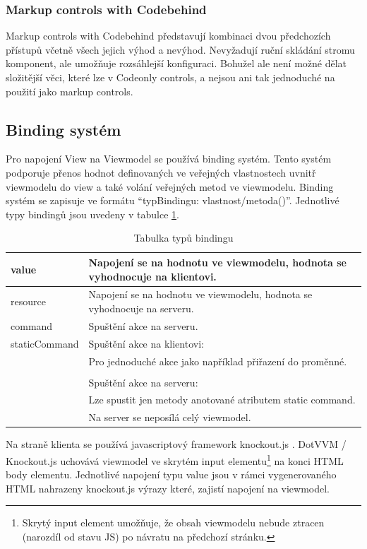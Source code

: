  \subsubsection{Markup controls with Codebehind}
 Markup controls with Codebehind představují kombinaci dvou předchozích přístupů včetně všech jejich výhod a nevýhod. Nevyžadují ruční skládání stromu komponent, ale umožňuje rozsáhlejší konfiguraci. Bohužel ale není možné dělat složitější věci, které lze v Codeonly controls, a nejsou ani tak jednoduché na použití jako markup controls.
 
\subsection*{Binding systém}
\label{DotVVMBinding}
Pro napojení View na Viewmodel se používá binding systém. Tento systém podporuje přenos hodnot definovaných ve veřejných vlastnostech uvnitř viewmodelu do view a také volání veřejných metod ve viewmodelu.
Binding systém se zapisuje ve formátu “{typBindingu: vlastnost/metoda()}”\cite{DotVVM-Binding}. Jednotlivé typy bindingů jsou uvedeny v tabulce \ref{tab: Tabulka typů bindingu}.

\begin{table}[H]
	\caption{Tabulka typů bindingu} 
	\centering
	\begin{tabular}{m{8em}|m{30em}}
		\toprule
		value & Napojení se na hodnotu ve viewmodelu, hodnota se vyhodnocuje na klientovi.\\ \midrule
		resource & Napojení se na hodnotu ve viewmodelu, hodnota se vyhodnocuje na serveru.\\ \midrule
		command & Spuštění akce na serveru.\\ \midrule
		staticCommand & Spuštění akce na klientovi: \\
		& Pro jednoduché akce jako například přiřazení do proměnné. \\\\
		& Spuštění akce na serveru: \\
		& Lze spustit jen metody anotované atributem static command. \\
		& Na server se neposílá celý viewmodel. \\

		\bottomrule
	\end{tabular}
	\label{tab: Tabulka typů bindingu}
\end{table}

Na straně klienta se používá javascriptový framework knockout.js . DotVVM / Knockout.js uchovává viewmodel ve skrytém input elementu\footnote{Skrytý input element umožňuje, že obsah viewmodelu nebude ztracen (narozdíl od stavu JS) po návratu na předchozí stránku.} na konci HTML body elementu. Jednotlivé napojení typu value jsou v rámci vygenerovaného HTML nahrazeny knockout.js výrazy které, zajistí napojení na viewmodel.

